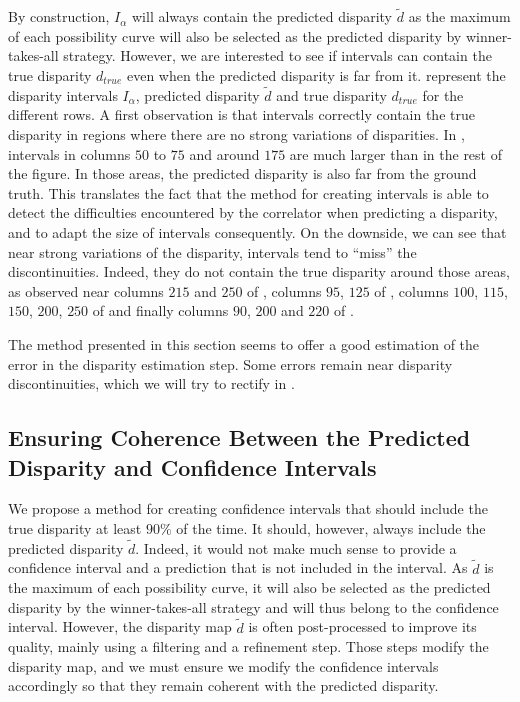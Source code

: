 By construction, $I_\alpha$ will always contain the predicted disparity $\tilde{d}$ as the maximum of each possibility curve will also be selected as the predicted disparity by winner-takes-all strategy. However, we are interested to see if intervals can contain the true disparity $d_{true}$ even when the predicted disparity is far from it.  represent the disparity intervals $I_\alpha$, predicted disparity $\tilde{d}$ and true disparity $d_{true}$ for the different rows. A first observation is that intervals correctly contain the true disparity in regions where there are no strong variations of disparities. In  , intervals in columns $50$ to $75$ and around $175$ are much larger than in the rest of the figure. In those areas, the predicted disparity is also far from the ground truth. This translates the fact that the method for creating intervals is able to detect the difficulties encountered by the correlator when predicting a disparity, and to adapt the size of intervals consequently. On the downside, we can see that near strong variations of the disparity, intervals tend to ``miss'' the discontinuities. Indeed, they do not contain the true disparity around those areas, as observed near columns $215$ and $250$ of , columns $95$, $125$ of , columns $100$, $115$, $150$, $200$, $250$ of  
and finally columns $90$, $200$ and $220$ of .

The method presented in this section seems to offer a good estimation of the error in the disparity estimation step. Some errors remain near disparity discontinuities, which we will try to rectify in .

\subsection{Ensuring Coherence Between the Predicted Disparity and Confidence Intervals}\label{sec:coherence_disparity_intervals}
We propose a method for creating confidence intervals that should include the true disparity at least $90\%$ of the time. It should, however, always include the predicted disparity $\tilde{d}$. Indeed, it would not make much sense to provide a confidence interval and a prediction that is not included in the interval. As $\tilde{d}$ is the maximum of each possibility curve, it will also be selected as the predicted disparity by the winner-takes-all strategy and will thus belong to the confidence interval. However, the disparity map $\tilde{d}$ is often post-processed to improve its quality, mainly using a filtering and a refinement step. Those steps modify the disparity map, and we must ensure we modify the confidence intervals accordingly so that they remain coherent with the predicted disparity. 

